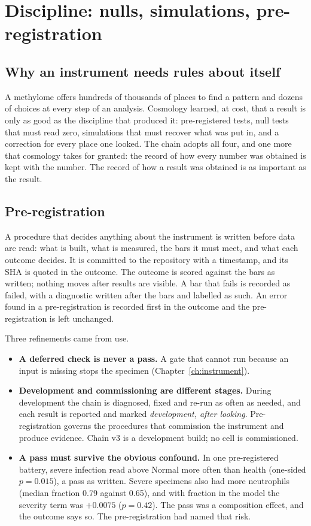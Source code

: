 \chapter{Discipline: nulls, simulations, pre-registration}\label{ch:discipline}

\section{Why an instrument needs rules about itself}

A methylome offers hundreds of thousands of places to find a pattern and dozens of choices at every step of an analysis. Cosmology learned, at
cost, that a result is only as good as the discipline that produced it: pre-registered tests, null tests that must read zero, simulations that must
recover what was put in, and a correction for every place one looked. The chain adopts all four, and one more that cosmology takes for granted: the
record of how every number was obtained is kept with the number. The record of how a result was obtained is as important as the result.

\section{Pre-registration}

A procedure that decides anything about the instrument is written before data are read: what is built, what is measured, the bars it must meet, and what
each outcome decides. It is committed to the repository with a timestamp, and its SHA is quoted in the outcome. The outcome is scored against the bars as
written; nothing moves after results are visible. A bar that fails is recorded as failed, with a diagnostic written after the bars and labelled as such.
An error found in a pre-registration is recorded first in the outcome and the pre-registration is left unchanged.

Three refinements came from use.
\begin{itemize}
\item \textbf{A deferred check is never a pass.} A gate that cannot run because an input is missing stops the specimen (Chapter~\ref{ch:instrument}).
\item \textbf{Development and commissioning are different stages.} During development the chain is diagnosed, fixed and re-run as often as needed, and each
      result is reported and marked \emph{development, after looking}. Pre-registration governs the procedures that commission the instrument and produce
      evidence. Chain v3 is a development build; no cell is commissioned.
\item \textbf{A pass must survive the obvious confound.} In one pre-registered battery, severe infection read above Normal more often than health
      (one-sided $p=0.015$), a pass as written. Severe specimens also had more neutrophils (median fraction 0.79 against 0.65), and with fraction in the model
      the severity term was $+0.0075$ ($p=0.42$). \measured{} The pass was a composition effect, and the
      outcome says so. The pre-registration had named that risk.
\end{itemize}

